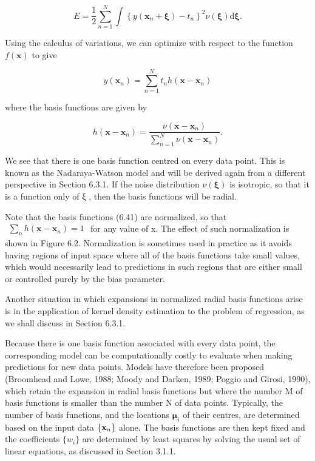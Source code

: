 \documentclass[
  10
]{article}
\begin{document}
\[
E = \frac {1}{2} \sum_ {n = 1} ^ {N} \int \left\{y (\mathbf {x} _ {n} + \pmb {\xi}) - t _ {n} \right\} ^ {2} \nu (\pmb {\xi}) \mathrm{d} \pmb {\xi}.\tag{6.39}
\]

Using the calculus of variations, we can optimize with respect to the
function \(f ( \mathbf { x } )\) to give

\[
y (\mathbf {x} _ {n}) = \sum_ {n = 1} ^ {N} t _ {n} h (\mathbf {x} - \mathbf {x} _ {n})\tag{6.40}
\]

where the basis functions are given by

\[
h (\mathbf {x} - \mathbf {x} _ {n}) = \frac {\nu (\mathbf {x} - \mathbf {x} _ {n})}{\sum_ {n = 1} ^ {N} \nu (\mathbf {x} - \mathbf {x} _ {n})}.\tag{6.41}
\]

We see that there is one basis function centred on every data point.
This is known as the Nadaraya-Watson model and will be derived again
from a different perspective in Section 6.3.1. If the noise distribution
\(\nu ( \pmb { \xi } )\) is isotropic, so that it is a function only of
ξ , then the basis functions will be radial.

Note that the basis functions (6.41) are normalized, so that
\(\begin{array} { r } { \sum _ { n } h ( \mathbf x - \mathbf x _ { n } ) = 1 } \end{array}\)
for any value of x. The effect of such normalization is shown in Figure
6.2. Normalization is sometimes used in practice as it avoids having
regions of input space where all of the basis functions take small
values, which would necessarily lead to predictions in such regions that
are either small or controlled purely by the bias parameter.

Another situation in which expansions in normalized radial basis
functions arise is in the application of kernel density estimation to
the problem of regression, as we shall discuss in Section 6.3.1.

Because there is one basis function associated with every data point,
the corresponding model can be computationally costly to evaluate when
making predictions for new data points. Models have therefore been
proposed (Broomhead and Lowe, 1988; Moody and Darken, 1989; Poggio and
Girosi, 1990), which retain the expansion in radial basis functions but
where the number M of basis functions is smaller than the number N of
data points. Typically, the number of basis functions, and the locations
\(\pmb { \mu } _ { i }\) of their centres, are determined based on the
input data \(\left\{ { \bf x } _ { n } \right\}\) alone. The basis
functions are then kept fixed and the coefficients \(\{ w _ { i } \}\)
are determined by least squares by solving the usual set of linear
equations, as discussed in Section 3.1.1.
\end{document}
